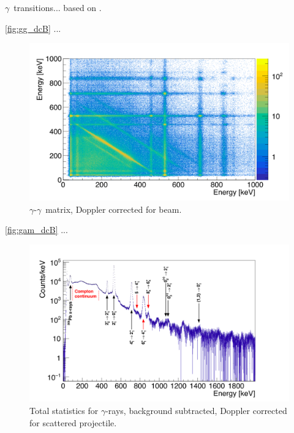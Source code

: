 \documentclass[twoside,english]{uiofysmaster/uiofysmaster}
\newcommand{\ga}{$\gamma$}
\let\orgautoref\autoref
\renewcommand{\autoref}
        {%
		 \def\sectionautorefname{Section}%
		 \def\subsectionautorefname{Section}%
		 \def\subsubsectionautorefname{Section}%
		 \def\chapterautorefname{Chapter}%
          \orgautoref}
\begin{document}
\begin{table}[htb] 
    \centering 
    \caption{\ga\ transitions... based on \cite{Klintefjord, NNDC-levels}.}
	
	\label{tab:gamma_trans}
\end{table}



\bigskip

\autoref{fig:gg_dcB} ...

\begin{figure}[ht]
	\centering
	\includegraphics[width=\textwidth]{../Plots/plotting/gg_dcB.png}
	\caption{\ga-\ga\ matrix, Doppler corrected for beam.}
	\label{fig:gg_dcB}
\end{figure}


\autoref{fig:gam_dcB} ...

\begin{figure}[ht]
	\centering
	\includegraphics[width=\textwidth]{../Plots/plotting/gam_dcB.png}
	\caption{Total statistics for \ga-rays, 
      background subtracted, Doppler corrected for scattered projectile.}
	\label{fig:gam_dcB}
\end{figure}
\end{document}
